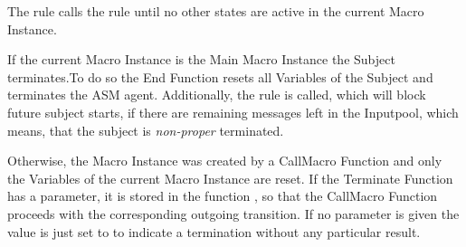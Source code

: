 The  rule calls the  rule until no other states are active in the current Macro Instance.

If the current Macro Instance is the Main Macro Instance the Subject terminates.To do so the End Function resets all Variables of the Subject and terminates the ASM agent. Additionally, the  rule is called, which will block future subject starts, if there are remaining messages left in the Inputpool, which means, that the subject is \textit{non-proper} terminated.

Otherwise, the Macro Instance was created by a CallMacro Function and only the Variables of the current Macro Instance are reset. If the Terminate Function has a parameter, it is stored in the function , so that the CallMacro Function proceeds with the corresponding outgoing transition. If no parameter is given the value is just set to  to indicate a termination without any particular result.

